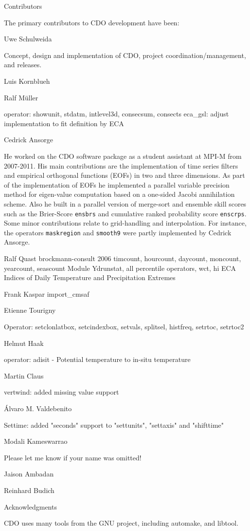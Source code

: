 Contributors

The primary contributors to CDO development have been: 

Uwe Schulweida

Concept, design and implementation of CDO, project coordination/management, and releases.

Luis Kornblueh

Ralf Müller

operator: showunit, stdatm, intlevel3d, consecsum, consects
eca_gsl: adjust implementation to fit definition by ECA

Cedrick Ansorge

He worked on the CDO software package as a student assistant at MPI-M from 2007-2011.
His main contributions are the implementation of {time series filters} and {empirical orthogonal functions (EOFs)} in two and three dimensions. 
As part of the implementation of EOFs he implemented a parallel variable precision method for eigen-value computation based on a one-sided 
Jacobi annihilation scheme. 
Also he built in a parallel version of merge-sort and ensemble skill scores such as the {Brier-Score} \texttt{ensbrs} and
{cumulative ranked probability score} \texttt{enscrps}.
Some minor contributions relate to grid-handling and interpolation. For instance, the operators \texttt{maskregion} and \texttt{smooth9} 
were partly implemented by Cedrick Ansorge.

Ralf Quast brockmann-consult 2006
timcount, hourcount, daycount, moncount, yearcount, seascount
Module Ydrunstat, all percentile operators, 
wct, hi
ECA Indices of Daily Temperature and Precipitation Extremes

Frank Kaspar
import_cmsaf

Etienne Tourigny

Operator: setclonlatbox, setcindexbox, setvals, splitsel, histfreq, setrtoc, setrtoc2

Helmut Haak

operator: adisit - Potential temperature to in-situ temperature

Martin Claus

vertwind: added missing value support

Álvaro M. Valdebenito

Settime: added "seconds" support to "settunits", "settaxis" and "shifttime"

Modali Kameswarrao


Please let me know if your name was omitted!


Jaison Ambadan

Reinhard Budich


Acknowledgments

CDO uses many tools from the GNU project, including automake, and libtool. 
